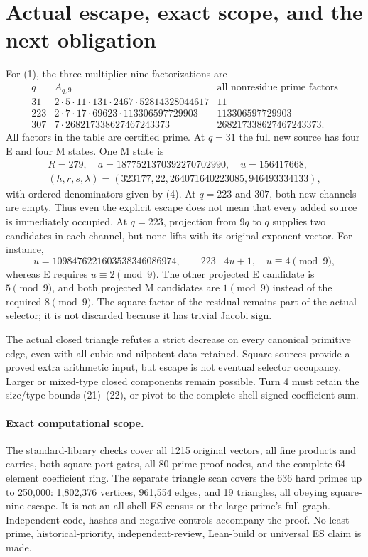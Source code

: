 \section{Actual escape, exact scope, and the next obligation}
For (1), the three multiplier-nine factorizations are
\[
\begin{array}{c|l|l}
q&A_{q,9}&\text{all nonresidue prime factors}\\\hline
31&2\cdot5\cdot11\cdot131\cdot2467\cdot52814328044617&11\\
223&2\cdot7\cdot17\cdot69623\cdot113306597729903&113306597729903\\
307&7\cdot268217338627467243373&268217338627467243373.
\end{array}                                                   \tag{24}
\]
All factors in the table are certified prime. At $q=31$ the full new source has
four E and four M states. One M state is
\[
\begin{gathered}
 R=279,\quad a=1877521370392270702990,\quad u=156417668,\\
 (h,r,s,\lambda)=(323177,22,264071640223085,946493334133),
\end{gathered}                                                \tag{25}
\]
with ordered denominators given by (4). At $q=223$ and $307$, both new channels
are empty. Thus even the explicit escape does not mean that every added source
is immediately occupied. At $q=223$, projection from $9q$ to $q$ supplies two
candidates in each channel, but none lifts with its original exponent vector.
For instance,
\[
 u=1098476221603538346086974,\qquad
 223\mid4u+1,\quad u\equiv4\pmod9,
\]
whereas E requires $u\equiv2\pmod9$. The other projected E candidate is
$5\pmod9$, and both projected M candidates are $1\pmod9$ instead of the
required $8\pmod9$. The square factor of the residual remains part of the
actual selector; it is not discarded because it has trivial Jacobi sign.

The actual closed triangle refutes a strict decrease on every canonical primitive
edge, even with all cubic and nilpotent data retained. Square sources provide a
proved extra arithmetic input, but escape is not eventual selector occupancy.
Larger or mixed-type closed components remain possible. Turn 4 must retain the
size/type bounds (21)--(22), or pivot to the complete-shell signed coefficient sum.

\paragraph{Exact computational scope.}
The standard-library checks cover all 1215 original vectors, all fine products
and carries, both square-port gates, all 80 prime-proof nodes, and the complete
64-element coefficient ring. The separate triangle scan covers the 636 hard
primes up to 250,000: 1,802,376 vertices, 961,554 edges, and 19 triangles, all
obeying square-nine escape. It is not an all-shell ES census or the large prime's
full graph. Independent code, hashes and negative controls accompany the proof.
No least-prime, historical-priority, independent-review, Lean-build or universal
ES claim is made.
